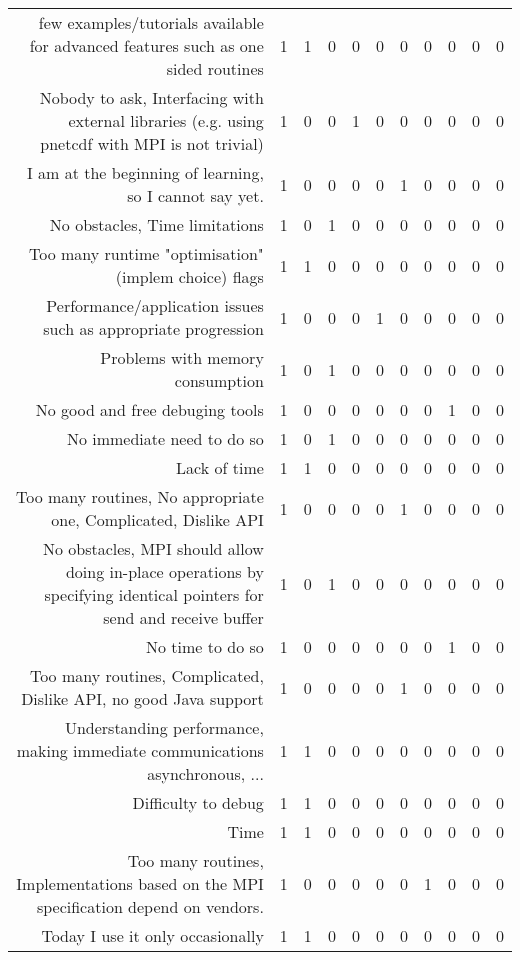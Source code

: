{\begin{landscape}
\begin{longtable}[htb]{r|c|c|c|c|c|c|c|c|c|c}
{few examples/tutorials available for advanced features such as one sided routines} & 1 & 1 & 0 & 0 & 0 & 0 & 0 & 0 & 0 & 0 \\%
{Nobody to ask, Interfacing with external libraries (e.g. using pnetcdf with MPI is not trivial)} & 1 & 0 & 0 & 1 & 0 & 0 & 0 & 0 & 0 & 0 \\%
{I am at the beginning of learning, so I cannot say yet.} & 1 & 0 & 0 & 0 & 0 & 1 & 0 & 0 & 0 & 0 \\%
{No obstacles, Time limitations} & 1 & 0 & 1 & 0 & 0 & 0 & 0 & 0 & 0 & 0 \\%
{Too many runtime "optimisation" (implem choice) flags} & 1 & 1 & 0 & 0 & 0 & 0 & 0 & 0 & 0 & 0 \\%
{Performance/application issues such as appropriate progression} & 1 & 0 & 0 & 0 & 1 & 0 & 0 & 0 & 0 & 0 \\%
{Problems with memory consumption} & 1 & 0 & 1 & 0 & 0 & 0 & 0 & 0 & 0 & 0 \\%
{No good and free debuging tools} & 1 & 0 & 0 & 0 & 0 & 0 & 0 & 1 & 0 & 0 \\%
{No immediate need to do so} & 1 & 0 & 1 & 0 & 0 & 0 & 0 & 0 & 0 & 0 \\%
{Lack of time} & 1 & 1 & 0 & 0 & 0 & 0 & 0 & 0 & 0 & 0 \\%
{Too many routines, No appropriate one, Complicated, Dislike API} & 1 & 0 & 0 & 0 & 0 & 1 & 0 & 0 & 0 & 0 \\%
{No obstacles, MPI should allow doing in-place operations by specifying identical pointers for send and receive buffer} & 1 & 0 & 1 & 0 & 0 & 0 & 0 & 0 & 0 & 0 \\%
{No time to do so} & 1 & 0 & 0 & 0 & 0 & 0 & 0 & 1 & 0 & 0 \\%
{Too many routines, Complicated, Dislike API, no good Java support} & 1 & 0 & 0 & 0 & 0 & 1 & 0 & 0 & 0 & 0 \\%
{Understanding performance, making immediate communications asynchronous, ...} & 1 & 1 & 0 & 0 & 0 & 0 & 0 & 0 & 0 & 0 \\%
{Difficulty to debug} & 1 & 1 & 0 & 0 & 0 & 0 & 0 & 0 & 0 & 0 \\%
{Time} & 1 & 1 & 0 & 0 & 0 & 0 & 0 & 0 & 0 & 0 \\%
{Too many routines, Implementations based on the MPI specification depend on vendors.} & 1 & 0 & 0 & 0 & 0 & 0 & 1 & 0 & 0 & 0 \\%
{Today I use it only occasionally} & 1 & 1 & 0 & 0 & 0 & 0 & 0 & 0 & 0 & 0 \\%

\end{longtable}
\end{landscape}}

